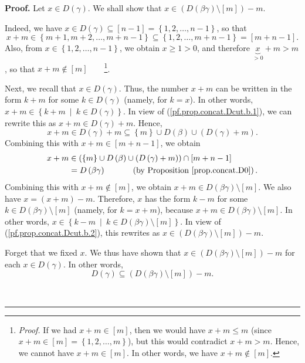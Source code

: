 \documentclass[numbers=enddot,12pt,final,onecolumn,notitlepage]{scrartcl}%
\theoremstyle{definition}
\newenvironment{proof}[1][Proof]{\noindent\textbf{#1.} }{\ \rule{0.5em}{0.5em}}
\begin{document}
\begin{proof}
Let $x\in D\left(  \gamma\right)  $. We shall show that $x\in\left(  D\left(
\beta\gamma\right)  \setminus\left[  m\right]  \right)  -m$.

Indeed, we have $x\in D\left(  \gamma\right)  \subseteq\left[  n-1\right]
=\left\{  1,2,\ldots,n-1\right\}  $, so that
\[
x+m\in\left\{  m+1,m+2,\ldots,m+n-1\right\}  \subseteq\left\{  1,2,\ldots
,m+n-1\right\}  =\left[  m+n-1\right]  .
\]
Also, from $x\in\left\{  1,2,\ldots,n-1\right\}  $, we obtain $x\geq1>0$, and
therefore $\underbrace{x}_{>0}+m>m$, so that $x+m\notin\left[  m\right]
$\ \ \ \ \footnote{\textit{Proof.} If we had $x+m\in\left[  m\right]  $, then
we would have $x+m\leq m$ (since $x+m\in\left[  m\right]  =\left\{
1,2,\ldots,m\right\}  $), but this would contradict $x+m>m$. Hence, we cannot
have $x+m\in\left[  m\right]  $. In other words, we have $x+m\notin\left[
m\right]  $.}.

Next, we recall that $x\in D\left(  \gamma\right)  $. Thus, the number $x+m$
can be written in the form $k+m$ for some $k\in D\left(  \gamma\right)  $
(namely, for $k=x$). In other words, $x+m\in\left\{  k+m\ \mid\ k\in D\left(
\gamma\right)  \right\}  $. In view of (\ref{pf.prop.concat.Dcut.b.1}), we can
rewrite this as $x+m\in D\left(  \gamma\right)  +m$. Hence,%
\[
x+m\in D\left(  \gamma\right)  +m\subseteq\left\{  m\right\}  \cup D\left(
\beta\right)  \cup\left(  D\left(  \gamma\right)  +m\right)  .
\]
Combining this with $x+m\in\left[  m+n-1\right]  $, we obtain%
\begin{align*}
x+m  &  \in\left(  \left\{  m\right\}  \cup D\left(  \beta\right)  \cup\left(
D\left(  \gamma\right)  +m\right)  \right)  \cap\left[  m+n-1\right] \\
&  =D\left(  \beta\gamma\right)  \ \ \ \ \ \ \ \ \ \ \left(  \text{by
Proposition \ref{prop.concat.D0}}\right)  .
\end{align*}
Combining this with $x+m\notin\left[  m\right]  $, we obtain $x+m\in D\left(
\beta\gamma\right)  \setminus\left[  m\right]  $. We also have $x=\left(
x+m\right)  -m$. Therefore, $x$ has the form $k-m$ for some $k\in D\left(
\beta\gamma\right)  \setminus\left[  m\right]  $ (namely, for $k=x+m$),
because $x+m\in D\left(  \beta\gamma\right)  \setminus\left[  m\right]  $. In
other words, $x\in\left\{  k-m\ \mid\ k\in D\left(  \beta\gamma\right)
\setminus\left[  m\right]  \right\}  $. In view of
(\ref{pf.prop.concat.Dcut.b.2}), this rewrites as $x\in\left(  D\left(
\beta\gamma\right)  \setminus\left[  m\right]  \right)  -m$.

Forget that we fixed $x$. We thus have shown that $x\in\left(  D\left(
\beta\gamma\right)  \setminus\left[  m\right]  \right)  -m$ for each $x\in
D\left(  \gamma\right)  $. In other words,%
\begin{equation}
D\left(  \gamma\right)  \subseteq\left(  D\left(  \beta\gamma\right)
\setminus\left[  m\right]  \right)  -m. \label{pf.prop.concat.Dcut.b.3}%
\end{equation}



\end{proof}
\end{document}
